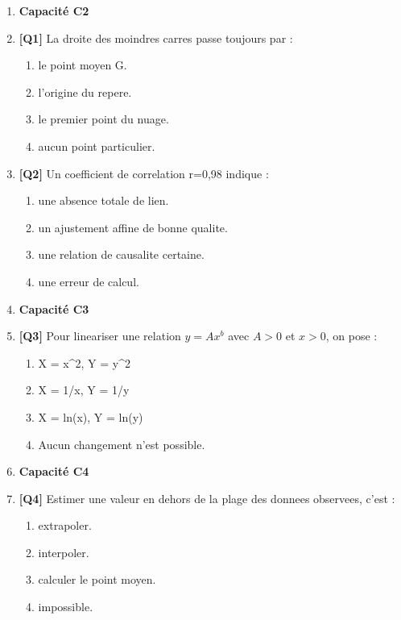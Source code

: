 \begin{enumerate}

\item[] \textbf{Capacité C2}

\item \textbf{[Q1]} La droite des moindres carres passe toujours par :
  \begin{enumerate}[label=\Alph*.]
    \item le point moyen G.
    \item l'origine du repere.
    \item le premier point du nuage.
    \item aucun point particulier.
  \end{enumerate}

\item \textbf{[Q2]} Un coefficient de correlation r=0,98 indique :
  \begin{enumerate}[label=\Alph*.]
    \item une absence totale de lien.
    \item un ajustement affine de bonne qualite.
    \item une relation de causalite certaine.
    \item une erreur de calcul.
  \end{enumerate}

\item[] \textbf{Capacité C3}

\item \textbf{[Q3]} Pour lineariser une relation $y=Ax^b$ avec $A>0$ et $x>0$, on pose :
  \begin{enumerate}[label=\Alph*.]
    \item X = x\textasciicircum{}2, Y = y\textasciicircum{}2
    \item X = 1/x, Y = 1/y
    \item X = ln(x), Y = ln(y)
    \item Aucun changement n'est possible.
  \end{enumerate}

\item[] \textbf{Capacité C4}

\item \textbf{[Q4]} Estimer une valeur en dehors de la plage des donnees observees, c'est :
  \begin{enumerate}[label=\Alph*.]
    \item extrapoler.
    \item interpoler.
    \item calculer le point moyen.
    \item impossible.
  \end{enumerate}


\end{enumerate}
